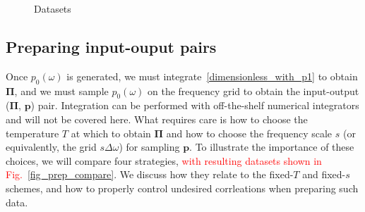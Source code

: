 \documentclass[notitlepage, 11pt, nofootinbib]{revtex4-1}
\renewcommand{\vec}[1]{\bm{#1}}
\begin{document}
\begin{figure}
\caption{Datasets}
\label{fig_datasets}
\end{figure}




\subsection{Preparing input-ouput pairs}
\label{sec_Pi}
Once $p_0(\omega)$ is generated, we must integrate~\eqref{dimensionless_with_p1} to obtain $\vec \Pi$, and we must sample $p_0(\omega)$ on the frequency grid to obtain the input-output ($\vec \Pi$, $\vec p$) pair. Integration can be performed with off-the-shelf numerical integrators and will not be covered here.
What requires care is how to choose the temperature $T$ at which to obtain $\vec\Pi$ and how to choose the frequency scale $s$ (or equivalently, the grid $s\Delta\omega$) for sampling $\vec p$. To illustrate the importance of these choices, we will compare four strategies, \textcolor{red}{with resulting datasets shown in Fig.~\ref{fig_prep_compare}}. We discuss how they relate to the fixed-$T$ and fixed-$s$ schemes, and how to properly control undesired corrleations when preparing such data.
\end{document}
